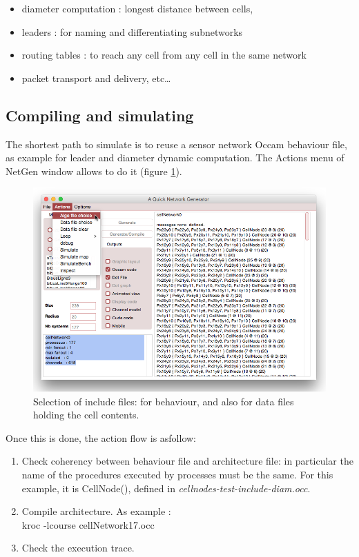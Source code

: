 \begin{itemize}
\item diameter computation : longest distance between cells,
\item leaders : for naming and differentiating subnetworks
\item routing tables : to reach any cell from any cell in the same network
\item packet transport and delivery, etc\ldots
\end{itemize}

\subsection {Compiling and simulating }

The shortest path to simulate is to reuse a sensor network Occam behaviour file,
as example for leader and diameter dynamic computation. The Actions menu
of NetGen window allows to do it (figure \ref{fig:NetGenAlgo}).

\begin{figure}[hbtp]
\begin{center} 
\includegraphics[width=12cm]{NetGenAlgoFile.png}
\caption{Selection of include files: for  behaviour, and also for data files holding the cell contents.}
\label{fig:NetGenAlgo}
\end{center}
\end{figure}

Once this is done, the action flow is asfollow:
\begin{enumerate}
\item Check coherency between behaviour file and architecture file: in particular the name of the
procedures executed by processes must be the same. For this example, it is CellNode(),
defined in {\sl cellnodes-test-include-diam.occ}.
\item Compile architecture. As example :\\
kroc -lcourse cellNetwork17.occ
\item Check the execution trace.
\end{enumerate}


